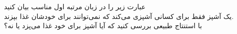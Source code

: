 	عبارت زیر را در زبان مرتبه اول مناسب بیان کنید\\
	یک آشپز فقط برای کسانی آشپزی می‌کند که نمی‌توانند برای خودشان غذا بپزند.\\
	با استنتاج طبیعی بررسی کنید که آیا آشپز برای خود غذا می‌پزد یا نه؟
